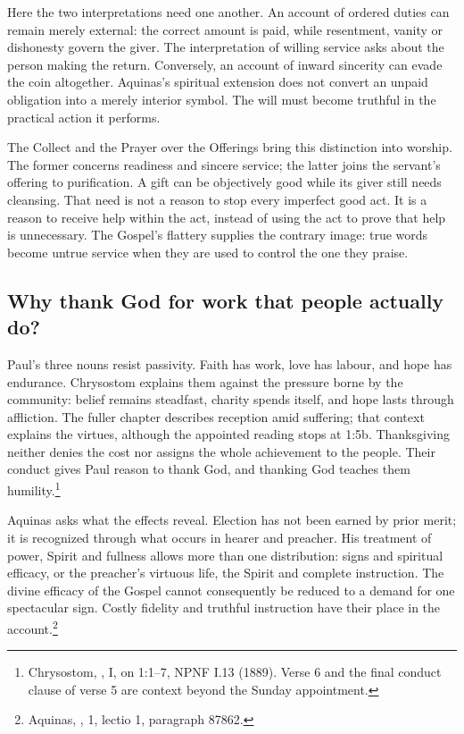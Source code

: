 Here the two interpretations need one another. An account of ordered duties can remain merely external: the correct amount is paid, while resentment, vanity or dishonesty govern the giver. The interpretation of willing service asks about the person making the return. Conversely, an account of inward sincerity can evade the coin altogether. Aquinas's spiritual extension does not convert an unpaid obligation into a merely interior symbol. The will must become truthful in the practical action it performs.

The Collect and the Prayer over the Offerings bring this distinction into worship. The former concerns readiness and sincere service; the latter joins the servant's offering to purification. A gift can be objectively good while its giver still needs cleansing. That need is not a reason to stop every imperfect good act. It is a reason to receive help within the act, instead of using the act to prove that help is unnecessary. The Gospel's flattery supplies the contrary image: true words become untrue service when they are used to control the one they praise.

\subsection{Why thank God for work that people actually do?}
Paul's three nouns resist passivity. Faith has work, love has labour, and hope has endurance. Chrysostom explains them against the pressure borne by the community: belief remains steadfast, charity spends itself, and hope lasts through affliction. The fuller chapter describes reception amid suffering; that context explains the virtues, although the appointed reading stops at 1:5b. Thanksgiving neither denies the cost nor assigns the whole achievement to the people. Their conduct gives Paul reason to thank God, and thanking God teaches them humility.\footnote{Chrysostom, , I, on 1:1--7, NPNF I.13 (1889). Verse 6 and the final conduct clause of verse 5 are context beyond the Sunday appointment.}

Aquinas asks what the effects reveal. Election has not been earned by prior merit; it is recognized through what occurs in hearer and preacher. His treatment of power, Spirit and fullness allows more than one distribution: signs and spiritual efficacy, or the preacher's virtuous life, the Spirit and complete instruction. The divine efficacy of the Gospel cannot consequently be reduced to a demand for one spectacular sign. Costly fidelity and truthful instruction have their place in the account.\footnote{Aquinas, , 1, lectio 1, paragraph 87862.}

